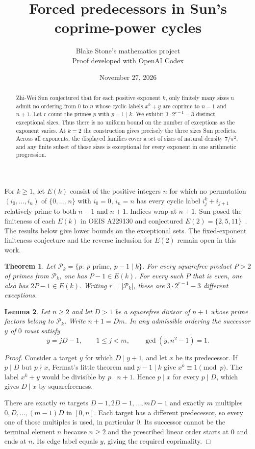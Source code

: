 \documentclass[11pt]{article}
\title{Forced predecessors in Sun's coprime-power cycles}
\author{Blake Stone's mathematics project\\\small Proof developed with OpenAI Codex}
\date{November 27, 2026}
\newtheorem{theorem}{Theorem}
\newtheorem{lemma}[theorem]{Lemma}
\begin{document}
\maketitle
\begin{abstract}
Zhi-Wei Sun conjectured that for each positive exponent $k$, only finitely many sizes $n$ admit no ordering from $0$ to $n$ whose cyclic labels $x^k+y$ are coprime to $n-1$ and $n+1$. Let $r$ count the primes $p$ with $p-1\mid k$. We exhibit $3\cdot 2^{r-1}-3$ distinct exceptional sizes. Thus there is no uniform bound on the number of exceptions as the exponent varies. At $k=2$ the construction gives precisely the three sizes Sun predicts. Across all exponents, the displayed families cover a set of sizes of natural density $7/\pi^2$, and any finite subset of those sizes is exceptional for every exponent in one arithmetic progression.
\end{abstract}

For $k\ge1$, let $E(k)$ consist of the positive integers $n$ for which no permutation $(i_0,\ldots,i_n)$ of $\{0,\ldots,n\}$ with $i_0=0$, $i_n=n$ has every cyclic label $i_j^k+i_{j+1}$ relatively prime to both $n-1$ and $n+1$. Indices wrap at $n+1$. Sun posed the finiteness of each $E(k)$ in OEIS A229130 and conjectured $E(2)=\{2,5,11\}$~\cite{sun}. The results below give lower bounds on the exceptional sets. The fixed-exponent finiteness conjecture and the reverse inclusion for $E(2)$ remain open in this work.

\begin{theorem}\label{th:main}
Let $\mathcal P_k=\{p:\ p\text{ prime},\ p-1\mid k\}$. For every squarefree product $P>2$ of primes from $\mathcal P_k$, one has $P-1\in E(k)$. For every such $P$ that is even, one also has $2P-1\in E(k)$. Writing $r=|\mathcal P_k|$, these are $3\cdot2^{r-1}-3$ different exceptions.
\end{theorem}

\begin{lemma}\label{lem:sat}
Let $n\ge2$ and let $D>1$ be a squarefree divisor of $n+1$ whose prime factors belong to $\mathcal P_k$. Write $n+1=Dm$. In any admissible ordering the successor $y$ of $0$ must satisfy
\[
     y=jD-1,\qquad 1\le j<m,\qquad \gcd(y,n^2-1)=1.
\]
\end{lemma}
\begin{proof}
Consider a target $y$ for which $D\mid y+1$, and let $x$ be its predecessor. If $p\mid D$ but $p\nmid x$, Fermat's little theorem and $p-1\mid k$ give $x^k\equiv1\pmod p$. The label $x^k+y$ would be divisible by $p\mid n+1$. Hence $p\mid x$ for every $p\mid D$, which gives $D\mid x$ by squarefreeness.

There are exactly $m$ targets $D-1,2D-1,\ldots,mD-1$ and exactly $m$ multiples $0,D,\ldots,(m-1)D$ in $[0,n]$. Each target has a different predecessor, so every one of those multiples is used, in particular $0$. Its successor cannot be the terminal element $n$ because $n\ge2$ and the prescribed linear order starts at $0$ and ends at $n$. Its edge label equals $y$, giving the required coprimality.
\end{proof}
\end{document}

